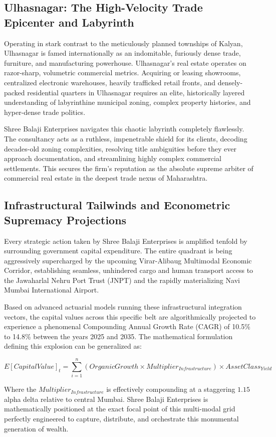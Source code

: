 \subsection{Ulhasnagar: The High-Velocity Trade Epicenter and Labyrinth}
Operating in stark contrast to the meticulously planned townships of Kalyan, Ulhasnagar is famed internationally as an indomitable, furiously dense trade, furniture, and manufacturing powerhouse. Ulhasnagar's real estate operates on razor-sharp, volumetric commercial metrics. Acquiring or leasing showrooms, centralized electronic warehouses, heavily trafficked retail fronts, and densely-packed residential quarters in Ulhasnagar requires an elite, historically layered understanding of labyrinthine municipal zoning, complex property histories, and hyper-dense trade politics. 

Shree Balaji Enterprises navigates this chaotic labyrinth completely flawlessly. The consultancy acts as a ruthless, impenetrable shield for its clients, decoding decades-old zoning complexities, resolving title ambiguities before they ever approach documentation, and streamlining highly complex commercial settlements. This secures the firm's reputation as the absolute supreme arbiter of commercial real estate in the deepest trade nexus of Maharashtra.

\subsection{Infrastructural Tailwinds and Econometric Supremacy Projections}
Every strategic action taken by Shree Balaji Enterprises is amplified tenfold by surrounding government capital expenditure. The entire quadrant is being aggressively supercharged by the upcoming Virar-Alibaug Multimodal Economic Corridor, establishing seamless, unhindered cargo and human transport access to the Jawaharlal Nehru Port Trust (JNPT) and the rapidly materializing Navi Mumbai International Airport.

Based on advanced actuarial models running these infrastructural integration vectors, the capital values across this specific belt are algorithmically projected to experience a phenomenal Compounding Annual Growth Rate (CAGR) of 10.5\% to 14.8\% between the years 2025 and 2035. The mathematical formulation defining this explosion can be generalized as:

\begin{equation}
E[CapitalValue]_{t} = \sum_{i=1}^{n} (OrganicGrowth \times Multiplier_{Infrastructure}) \times AssetClass_{Yield}
\end{equation}

Where the $Multiplier_{Infrastructure}$ is effectively compounding at a staggering $1.15$ alpha delta relative to central Mumbai. Shree Balaji Enterprises is mathematically positioned at the exact focal point of this multi-modal grid perfectly engineered to capture, distribute, and orchestrate this monumental generation of wealth.
